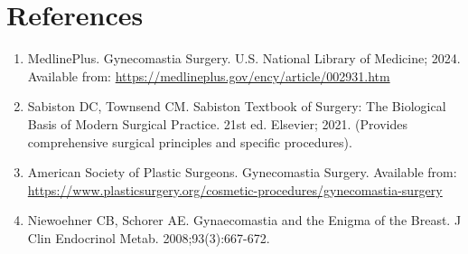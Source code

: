 \section*{References}
\begin{enumerate}
  \item MedlinePlus. Gynecomastia Surgery. U.S. National Library of Medicine; 2024. Available from: \url{https://medlineplus.gov/ency/article/002931.htm}
  \item Sabiston DC, Townsend CM. Sabiston Textbook of Surgery: The Biological Basis of Modern Surgical Practice. 21st ed. Elsevier; 2021. (Provides comprehensive surgical principles and specific procedures).
  \item American Society of Plastic Surgeons. Gynecomastia Surgery. Available from: \url{https://www.plasticsurgery.org/cosmetic-procedures/gynecomastia-surgery}
  \item Niewoehner CB, Schorer AE. Gynaecomastia and the Enigma of the Breast. J Clin Endocrinol Metab. 2008;93(3):667-672.
\end{enumerate}

\clearpage
